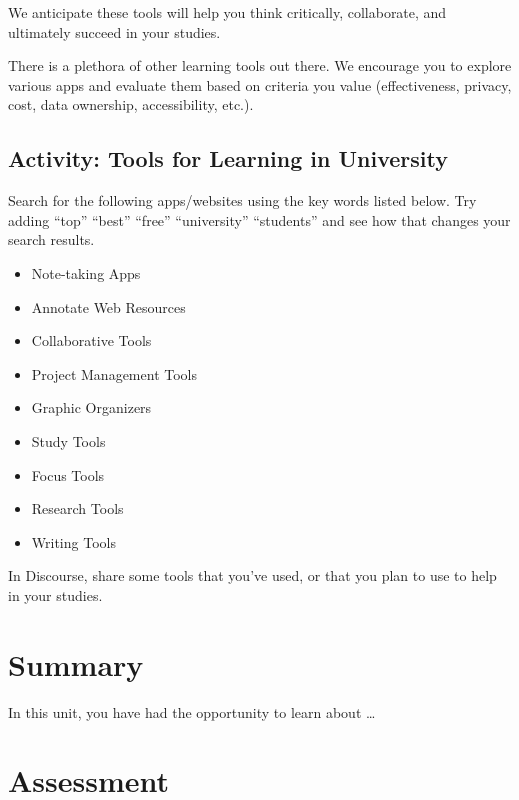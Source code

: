 \documentclass[
]{book}
\providecommand{\tightlist}{%
  \setlength{\itemsep}{0pt}\setlength{\parskip}{0pt}}
\theoremstyle{definition}
\theoremstyle{definition}
\theoremstyle{definition}
\theoremstyle{definition}
\theoremstyle{remark}
\begin{document}
We anticipate these tools will help you think critically, collaborate, and ultimately succeed in your studies.

There is a plethora of other learning tools out there. We encourage you to explore various apps and evaluate them based on criteria you value (effectiveness, privacy, cost, data ownership, accessibility, etc.).

\hypertarget{activity-tools-for-learning-in-university}{%
\subsection*{Activity: Tools for Learning in University}\label{activity-tools-for-learning-in-university}}

\begin{reflect}
Search for the following apps/websites using the key words listed below. Try adding ``top'' ``best'' ``free'' ``university'' ``students'' and see how that changes your search results.

\begin{itemize}
\tightlist
\item
  Note-taking Apps
\item
  Annotate Web Resources
\item
  Collaborative Tools
\item
  Project Management Tools
\item
  Graphic Organizers
\item
  Study Tools
\item
  Focus Tools
\item
  Research Tools
\item
  Writing Tools
\end{itemize}

In Discourse, share some tools that you've used, or that you plan to use to help in your studies.
\end{reflect}

\hypertarget{summary-2}{%
\section*{Summary}\label{summary-2}}

In this unit, you have had the opportunity to learn about \ldots{}

\hypertarget{assessment}{%
\section*{Assessment}\label{assessment}}
\end{document}
